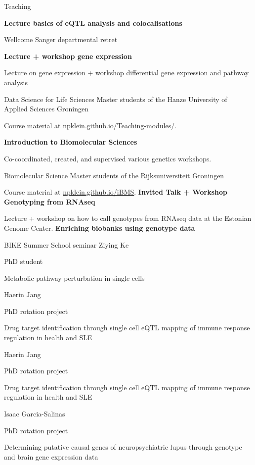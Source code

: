 \begin{rubric}{Teaching}
%
%

\entry*[16 Jun 2022]%
\textbf{Lecture basics of eQTL analysis and colocalisations} \par
Wellcome Sanger departmental retret


\entry*[Sep 2019]%
\textbf{Lecture + workshop gene expression} \par
Lecture on gene expression + workshop differential gene expression and pathway analysis \par
Data Science for Life Sciences Master students of the Hanze University of Applied Sciences Groningen \par
Course material at \url{npklein.github.io/Teaching-modules/}.


%
	\textbf{Introduction to Biomolecular Sciences} \par
	 Co-coordinated, created, and supervised various genetics workshops. \par
	 Biomolecular Science Master students of the Rijksuniversiteit Groningen \par
	 Course material at \url{npklein.github.io/iBMS}.
%
\entry*[26 Aug 2016]%
\textbf{Invited Talk + Workshop Genotyping from RNAseq} \par
Lecture + workshop on how to call genotypes from RNAseq data at the Estonian Genome Center.
%
\entry*[22 Jun 2016]%
\textbf{Enriching biobanks using genotype data} \par
BIKE Summer School seminar
%
\entry*[Mar 2021 -- ]%
Ziying Ke \par
PhD student \par
Metabolic pathway perturbation in single cells


%
Haerin Jang \par
PhD rotation project \par
Drug target identification through single cell eQTL mapping of immune response regulation in health and SLE

%
Haerin Jang \par
PhD rotation project \par
Drug target identification through single cell eQTL mapping of immune response regulation in health and SLE

%
Isaac Garcia-Salinas \par
PhD rotation project \par
Determining putative causal genes of neuropsychiatric lupus through genotype and brain gene expression data



\end{rubric}
